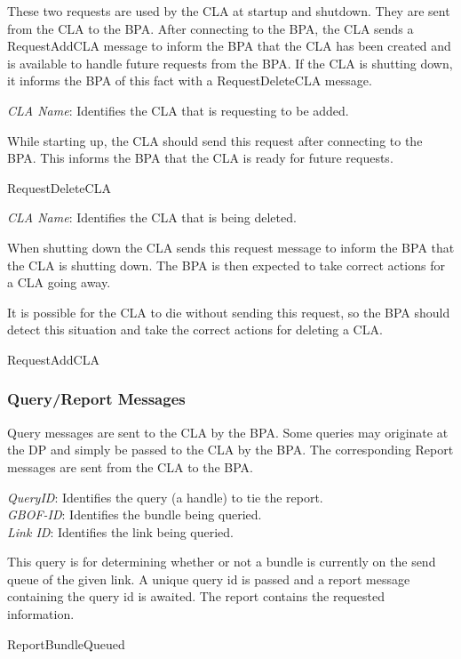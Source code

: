 These two requests are used by the CLA at startup and shutdown.
They are sent from the CLA to the BPA. After connecting to the BPA, the CLA
sends a RequestAddCLA message to inform the BPA that the CLA has been created
and is available to handle future requests from the BPA. If the CLA is shutting
down, it informs the BPA of this fact with a RequestDeleteCLA message.\\[1em]

{
\metP
    {\em CLA Name}: Identifies the CLA that is requesting to be added.

\metD
    While starting up, the CLA should send this request after connecting to the
    BPA. This informs the BPA that the CLA is ready for future requests.

\metR
    RequestDeleteCLA
}

{
\metP
    {\em CLA Name}: Identifies the CLA that is being deleted.

\metD
    When shutting down the CLA sends this request message to inform the BPA
    that the CLA is shutting down. The BPA is then expected to take correct
    actions for a CLA going away.

    It is possible for the CLA to die without sending this request, so the BPA
    should detect this situation and take the correct actions for deleting a
    CLA.

\metR
    RequestAddCLA
}

\subsubsection{Query/Report Messages}

Query messages are sent to the CLA by the BPA. Some queries may originate at
the DP and simply be passed to the CLA by the BPA. The corresponding Report
messages are sent from the CLA to the BPA.\\[1em]

{
\metP
    {\em QueryID}: Identifies the query (a handle) to tie the report.\\
    {\em GBOF-ID}: Identifies the bundle being queried.\\
    {\em Link ID}: Identifies the link being queried.

\metD
    This query is for determining whether or not a bundle is currently on
    the send queue of the given link. A unique query id is passed and a
    report message containing the query id is awaited. The report contains
    the requested information.

\metR
    ReportBundleQueued
}

